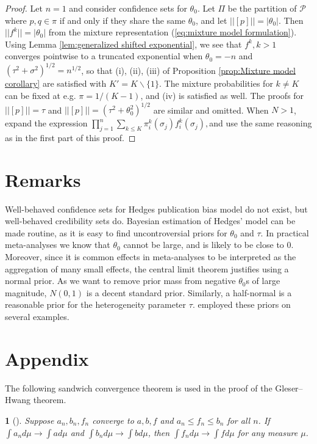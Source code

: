 \documentclass[article]{ajs}
\numberwithin{equation}{section}
\numberwithin{figure}{section}
\theoremstyle{plain}
\theoremstyle{definition}
\theoremstyle{definition}
\theoremstyle{plain}
\newtheorem{lem}[thm]{\protect\lemmaname}
\providecommand{\lemmaname}{Lemma}
\renewcommand{\sqrt}[1]{{(#1)^{1/2}}}
\begin{document}
\begin{proof}
\label{proof:general publication bias} Let $n=1$ and consider confidence
sets for $\theta_{0}$. Let $\Pi$ be the partition of $\mathcal{P}$
where $p,q\in\pi$ if and only if they share the same $\theta_{0}$,
and let $||[p]||=|\theta_{0}|$. Then $||f^{k}||=|\theta_{0}|$ from
the mixture representation (\ref{eq:mixture model formulation}).
Using Lemma \ref{lem:generalized shifted exponential}, we see that
$f^{k},k>1$ converges pointwise to a truncated exponential when $\theta_{0}=-n$
and $\sqrt{\tau^{2}+\sigma^{2}}=n^{1/2}$, so that (i), (ii), (iii)
of Proposition \ref{prop:Mixture model corollary} are satisfied with
$K'=K\backslash\{1\}$. The mixture probabilities for $k\neq K$ can
be fixed at e.g. $\pi=1/(K-1)$, and (iv) is satisfied as well. The
proofs for $||[p]||=\tau$ and $||[p]||=\sqrt{\tau^{2}+\theta_{0}^{2}}$
are similar and omitted. When $N>1$, expand the expression $\prod_{j=1}^{n}\sum_{k\leq K}\pi_{i}^{k}(\sigma_{j})f_{i}^{k}(\sigma_{j}),$and
use the same reasoning as in the first part of this proof.
\end{proof}

\section{Remarks}

Well-behaved confidence sets for Hedges publication bias model do
not exist, but well-behaved credibility sets do. Bayesian estimation
of Hedges' model can be made routine, as it is easy to find uncontroversial
priors for $\theta_{0}$ and $\tau$. In practical meta-analyses we
know that $\theta_{0}$ cannot be large, and is likely to be close
to $0$. Moreover, since it is common effects in meta-analyses to
be interpreted as the aggregation of many small effects, the central
limit theorem justifies using a normal prior. As we want to remove
prior mass from negative $\theta_{0}$s of large magnitude, $N(0,1)$
is a decent standard prior. Similarly, a half-normal is a reasonable
prior for the heterogeneity parameter $\tau$. \citet{moss2019modelling}
employed these priors on several examples. 

\section*{Appendix}

The following sandwich convergence theorem is used in the proof of
the Gleser--Hwang theorem. 
\begin{lem}[{\citet[Exercise 16.4(a)]{billingsley1995probability}}]
\label{lem:Dominated covergence theorem} Suppose $a_{n},b_{n},f_{n}$
converge to $a,b,f$ and $a_{n}\leq f_{n}\leq b_{n}$ for all $n$.
If $\int a_{n}d\mu\to\int ad\mu$ and $\int b_{n}d\mu\to\int bd\mu$,
then $\int f_{n}d\mu\to\int fd\mu$ for any measure $\mu$.
\end{lem}
\end{document}
